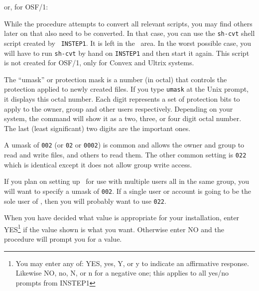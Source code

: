 \medskip

\noindent or, for OSF/1:\medskip

\medskip

\noindent While the procedure attempts to convert all relevant scripts,
you may find others later on that also need to be converted.  In that
case, you can use the {\tt sh-cvt} shell script created by {\tt
INSTEP1}.  It is left in the \AROOT\ area.  In the worst possible case,
you will have to run {\tt sh-cvt} by hand on {\tt INSTEP1} and then
start it again.  This script is not created for OSF/1, only for Convex
and Ultrix systems.

\medskip{}

The ``umask'' or protection mask is a number (in octal) that controls
the protection applied to newly created files.  If you type {\tt umask}
at the Unix prompt, it displays this octal number.  Each digit
represents a set of protection bits to apply to the owner, group and
other users respectively.  Depending on your system, the command will
show it as a two, three, or four digit octal number.  The last (least
significant) two digits are the important ones.

A umask of {\tt 002} (or {\tt 02} or {\tt 0002}) is common and allows
the owner and group to read and write files, and others to read them.
The other common setting is {\tt 022} which is identical except it does
not allow group write access.

If you plan on setting up \AIPS\ for use with multiple users all in the
same group, you will want to specify a umask of {\tt 002}.  If a single
user or account is going to be the sole user of \AIPS, then you will
probably want to use {\tt 022}.

\vfill\eject %
When you have decided what value is appropriate for your installation,
enter YES\footnote*{\eightrm \normalbaselineskip=8pt \parskip=1pt
			     You may enter any of: YES, yes, Y, or y to
                             indicate an affirmative response.  Likewise
                             NO, no, N, or n for a negative one; this
                             applies to all yes/no prompts from INSTEP1}
if the value shown is what you want.  Otherwise enter NO and the
procedure will prompt you for a value.

\medskip{}

